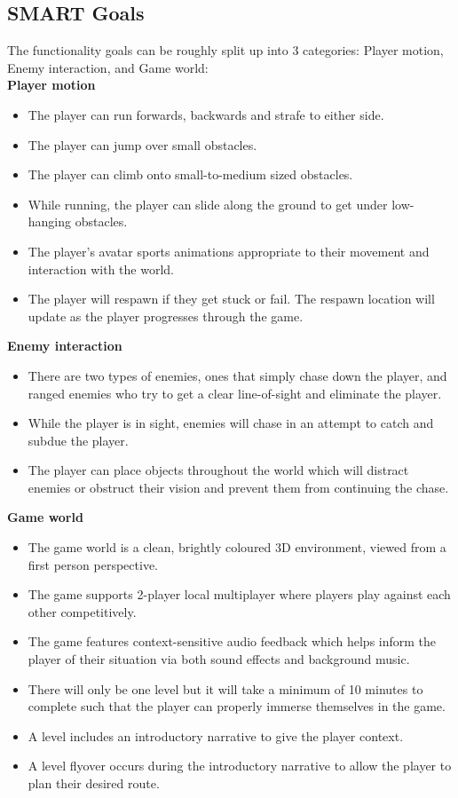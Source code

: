\documentclass[a4paper,10pt]{article}
\begin{document}
\subsection{SMART Goals} \label{goals}
The functionality goals can be roughly split up into 3 categories: Player motion, Enemy interaction, and Game world:\\
\textbf{Player motion}
\begin{itemize}
	\item The player can run forwards, backwards and strafe to either side.
	\item The player can jump over small obstacles.
	\item The player can climb onto small-to-medium sized obstacles.
	\item While running, the player can slide along the ground to get under low-hanging obstacles.
	\item The player's avatar sports animations appropriate to their movement and interaction with the world.
	\item The player will respawn if they get stuck or fail. The respawn location will update as the player progresses through the game.
\end{itemize}
\textbf{Enemy interaction}
\begin{itemize}
	\item There are two types of enemies, ones that simply chase down the player, and ranged enemies who try to get a clear line-of-sight and eliminate the player.
	\item While the player is in sight, enemies will chase in an attempt to catch and subdue the player.
	\item The player can place objects throughout the world which will distract enemies or obstruct their vision and prevent them from continuing the chase.
\end{itemize}
\textbf{Game world}
\begin{itemize}
	\item The game world is a clean, brightly coloured 3D environment, viewed from a first person perspective.
	\item The game supports 2-player local multiplayer where players play against each other competitively.
	\item The game features context-sensitive audio feedback which helps inform the player of their situation via both sound effects and background music.
	\item There will only be one level but it will take a minimum of 10 minutes to complete such that the player can properly immerse themselves in the game.
    \item A level includes an introductory narrative to give the player context.
    \item A level flyover occurs during the introductory narrative to allow the player to plan their desired route.
\end{itemize}
\end{document}
